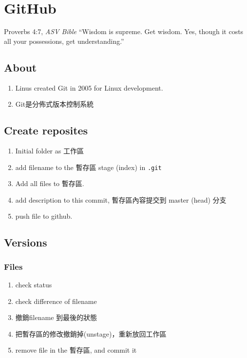 \chapter{GitHub}

\begin{chapquote}{Proverbs 4:7, \textit{ASV Bible}}
``Wisdom is supreme. Get wisdom. Yes, though it costs all your possessions, get understanding.''
\end{chapquote}

\section{About}
\begin{enumerate}
\item Linus created Git in 2005 for Linux development. 
\item Git是分佈式版本控制系統 
\end{enumerate}

\section{Create reposites}
\begin{enumerate}
\item{} Initial folder as 工作區
\item{} add filename to the 暫存區 stage (index) in \verb|.git|  
\item{} Add all files to 暫存區.
\item{} add description to this commit, 暫存區內容提交到 master (head) 分支
\item{} push file to github.
\end{enumerate}

\section{Versions}
\subsection{Files}
\begin{enumerate}
\item{} check status
\item{} check difference of filename
\item{} 撤銷filename 到最後的狀態
\item{} 把暫存區的修改撤銷掉(unstage)，重新放回工作區
\item{} remove file in the 暫存區, and commit it
\end{enumerate}

